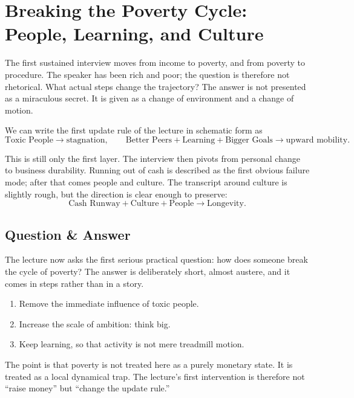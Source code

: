 \section{Breaking the Poverty Cycle: People, Learning, and Culture}

The first sustained interview moves from income to poverty, and from poverty to procedure. The speaker has been rich and poor; the question is therefore not rhetorical. What actual steps change the trajectory? The answer is not presented as a miraculous secret. It is given as a change of environment and a change of motion.

We can write the first update rule of the lecture in schematic form as
\begin{equation}
\text{Toxic People} \to \text{stagnation},
\qquad
\text{Better Peers}+\text{Learning}+\text{Bigger Goals} \to \text{upward mobility}.
\end{equation}

This is still only the first layer. The interview then pivots from personal change to business durability. Running out of cash is described as the first obvious failure mode; after that comes people and culture. The transcript around culture is slightly rough, but the direction is clear enough to preserve:
\begin{equation}
\text{Cash Runway}+\text{Culture}+\text{People} \to \text{Longevity}.
\end{equation}

\subsection{Question \& Answer}

The lecture now asks the first serious practical question: how does someone break the cycle of poverty? The answer is deliberately short, almost austere, and it comes in steps rather than in a story.

\begin{enumerate}
\item Remove the immediate influence of toxic people.
\item Increase the scale of ambition: think big.
\item Keep learning, so that activity is not mere treadmill motion.
\end{enumerate}

The point is that poverty is not treated here as a purely monetary state. It is treated as a local dynamical trap. The lecture's first intervention is therefore not ``raise money'' but ``change the update rule.''

